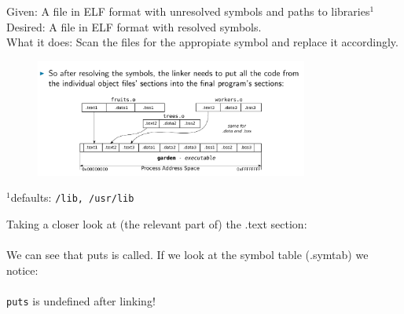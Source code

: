\documentclass[10pt]{beamer}
\begin{document}
\begin{frame}{}
    Given: A file in ELF format with unresolved symbols and paths to libraries$^1$ \\
    Desired: A file in ELF format with resolved symbols. \\
    What it does: Scan the files for the appropiate symbol and replace it accordingly.
    \begin{figure}
        \includegraphics[keepaspectratio, width=0.8\textwidth, height=\textheight-2\baselineskip-2\baselineskip]{img/reloc.png} \\
    \end{figure}
    
    \begin{tiny}
     $^1$defaults: \texttt{/lib, /usr/lib}
    \end{tiny}

    \framebreak
    
    Taking a closer look at (the relevant part of) the .text section: \\
     \vspace{0.35cm} \\  
    We can see that puts is called. If we look at the symbol table (.symtab) we notice: \\
     \vspace{0.55cm} \\  
    \texttt{puts} is undefined after linking! \\
    \framebreak
   

\end{frame}
\end{document}
